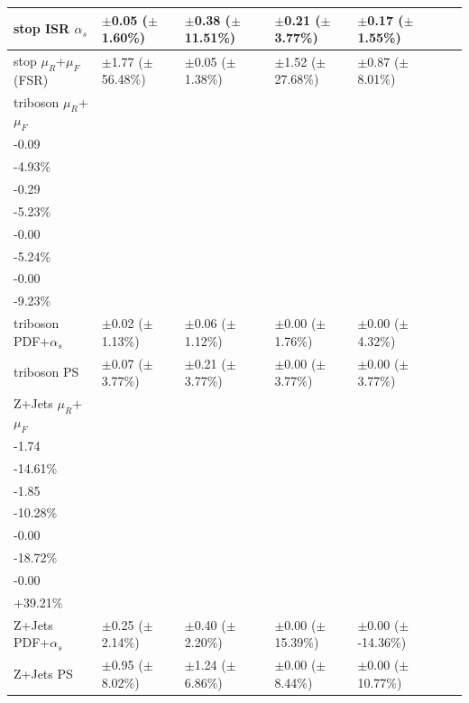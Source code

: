\begin{table}[ht]
{\begin{tabular}{l l l l l l l }
\midrule
stop ISR \(\alpha_s\) & \(\pm\)0.05 (\(\pm\)1.60\%) &\(\pm\)0.38 (\(\pm\)11.51\%) &\(\pm\)0.21 (\(\pm\)3.77\%) &\(\pm\)0.17 (\(\pm\)1.55\%) \tabularnewline
\midrule
stop \(\mu_R\)+\(\mu_F\) (FSR) & \(\pm\)1.77 (\(\pm\)56.48\%) &\(\pm\)0.05 (\(\pm\)1.38\%) &\(\pm\)1.52 (\(\pm\)27.68\%) &\(\pm\)0.87 (\(\pm\)8.01\%) \tabularnewline
\midrule
triboson \(\mu_R\)+\(\mu_F\) & \(\substack{+0.11\\-0.09}\) \big(\(\substack{+5.78\%\\-4.93\%}\)\big) & \(\substack{+0.34\\-0.29}\) \big(\(\substack{+6.10\%\\-5.23\%}\)\big) & \(\substack{+0.00\\-0.00}\) \big(\(\substack{+6.12\%\\-5.24\%}\)\big) & \(\substack{+0.00\\-0.00}\) \big(\(\substack{+10.97\%\\-9.23\%}\)\big) \tabularnewline
\midrule
triboson PDF+\(\alpha_s\) & \(\pm\)0.02 (\(\pm\)1.13\%) &\(\pm\)0.06 (\(\pm\)1.12\%) &\(\pm\)0.00 (\(\pm\)1.76\%) &\(\pm\)0.00 (\(\pm\)4.32\%) \tabularnewline
\midrule
triboson PS & \(\pm\)0.07 (\(\pm\)3.77\%) &\(\pm\)0.21 (\(\pm\)3.77\%) &\(\pm\)0.00 (\(\pm\)3.77\%) &\(\pm\)0.00 (\(\pm\)3.77\%) \tabularnewline
\midrule
Z+Jets \(\mu_R\)+\(\mu_F\) & \(\substack{+2.95\\-1.74}\) \big(\(\substack{+24.86\%\\-14.61\%}\)\big) & \(\substack{+1.10\\-1.85}\) \big(\(\substack{+6.08\%\\-10.28\%}\)\big) & \(\substack{+0.00\\-0.00}\) \big(\(\substack{+137.61\%\\-18.72\%}\)\big) & \(\substack{+0.00\\-0.00}\) \big(\(\substack{-262.80\%\\+39.21\%}\)\big) \tabularnewline
\midrule
Z+Jets PDF+\(\alpha_s\) & \(\pm\)0.25 (\(\pm\)2.14\%) &\(\pm\)0.40 (\(\pm\)2.20\%) &\(\pm\)0.00 (\(\pm\)15.39\%) &\(\pm\)0.00 (\(\pm\)-14.36\%) \tabularnewline
\midrule
Z+Jets PS & \(\pm\)0.95 (\(\pm\)8.02\%) &\(\pm\)1.24 (\(\pm\)6.86\%) &\(\pm\)0.00 (\(\pm\)8.44\%) &\(\pm\)0.00 (\(\pm\)10.77\%) \tabularnewline
\bottomrule
\end{tabular}}
\end{table}


